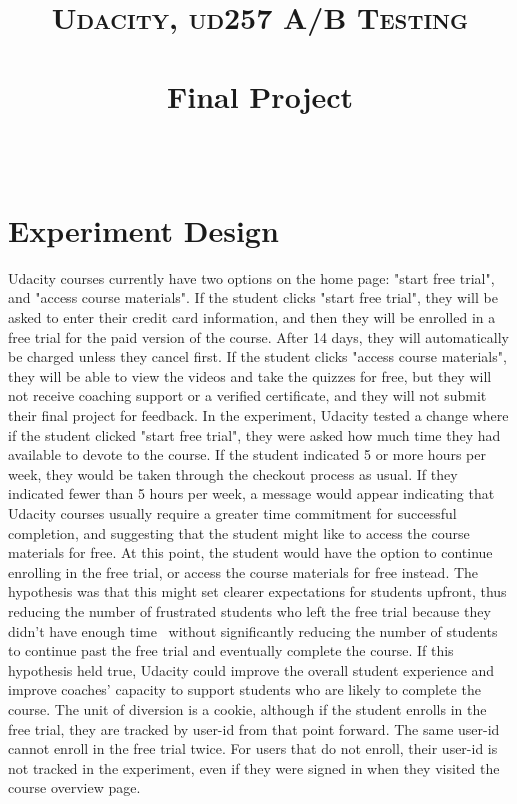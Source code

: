 \documentclass[paper=a4, fontsize=11pt]{scrartcl} %
\title{	
\normalfont \normalsize 
\textsc{Udacity, ud257 A/B Testing} \\ [25pt] %
\horrule{0.5pt} \\[0.4cm] %
\huge Final Project \\ %
\horrule{2pt} \\[0.5cm] %
}
\numberwithin{equation}{section} %
\numberwithin{figure}{section} %
\numberwithin{table}{section} %
\begin{document}
\maketitle %


\section{Experiment Design}

Udacity courses currently have two options on the home page: "start free trial", and "access course materials". If the student clicks "start free trial", they will be asked to enter their credit card information, and then they will be enrolled in a free trial for the paid version of the course. After 14 days, they will automatically be charged unless they cancel first. If the student clicks "access course materials", they will be able to view the videos and take the quizzes for free, but they will not receive coaching support or a verified certificate, and they will not submit their final project for feedback.
\newline \newline
In the experiment, Udacity tested a change where if the student clicked "start free trial", they were asked how much time they had available to devote to the course. If the student indicated 5 or more hours per week, they would be taken through the checkout process as usual. If they indicated fewer than 5 hours per week, a message would appear indicating that Udacity courses usually require a greater time commitment for successful completion, and suggesting that the student might like to access the course materials for free. At this point, the student would have the option to continue enrolling in the free trial, or access the course materials for free instead.
\newline \newline
The hypothesis was that this might set clearer expectations for students upfront, thus reducing the number of frustrated students who left the free trial because they didn't have enough time \textemdash \ without significantly reducing the number of students to continue past the free trial and eventually complete the course. If this hypothesis held true, Udacity could improve the overall student experience and improve coaches' capacity to support students who are likely to complete the course.
The unit of diversion is a cookie, although if the student enrolls in the free trial, they are tracked by user-id from that point forward. The same user-id cannot enroll in the free trial twice. For users that do not enroll, their user-id is not tracked in the experiment, even if they were signed in when they visited the course overview page. \newline
\end{document}
